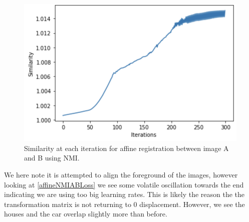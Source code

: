 \begin{figure}
	\centering
	\includegraphics[width=0.4\linewidth]{Materials/affineNMIABLoss}
	\caption{Similarity at each iteration for affine registration between image A and B using NMI.}
	\label{affineNMIABLoss}
\end{figure}
We here note it is attempted to align the foreground of the images, however looking at \autoref{affineNMIABLoss} we see some volatile oscillation towards the end indicating we are using too big learning rates. This is likely the reason the the transformation matrix is not returning to 0 displacement. However, we see the houses and the car overlap slightly more than before. 